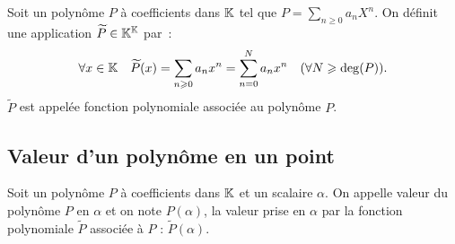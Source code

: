 \begin{defdef}
  Soit un polynôme \(P\) à coefficients dans \(\mathbb{K}\) tel que \(P = \sum_{n
  \geqslant 0}a_n X^n\). On définit une application \(\widetilde{P} \in \mathbb{K}^{\mathbb{K}}\)
  par~:
  \begin{equation}
    \forall x \in \mathbb{K} \quad \widetilde{P}(x) = \sum_{n \geqslant 0} a_n
    x^n = \sum_{n = 0}^N a_n x^n \quad (\forall N \geqslant \deg(P)).
  \end{equation}
  \(\widetilde{P}\) est appelée fonction polynomiale associée au polynôme \(P\).
\end{defdef}

\subsection{Valeur d'un polynôme en un point}

\begin{defdef}
  Soit un polynôme \(P\) à coefficients dans \(\mathbb{K}\) et un scalaire \(\alpha\).
  On appelle valeur du polynôme \(P\) en \(\alpha\) et on note \(P(\alpha)\), la
  valeur prise en \(\alpha\) par la fonction polynomiale \(\widetilde{P}\)
  associée à \(P\) : \(\widetilde{P}(\alpha)\).
\end{defdef}

